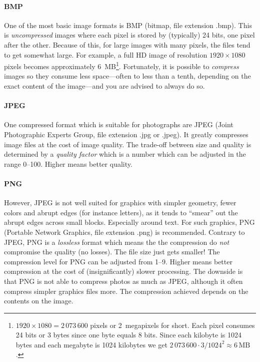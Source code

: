 {\paragraph{BMP}
One of the most basic image formats is BMP (bitmap, file extension .bmp). This is \emph{uncompressed} images where each pixel is stored by (typically) 24 bits, one pixel after the other. Because of this, for large images with many pixels, the files tend to get somewhat large. For example, a full HD image of resolution $1920\times 1080$ pixels becomes approximately 6~MB\footnote{$1920\times 1080=2\,073\,600$ pixels or 2~megapixels for short. Each pixel consumes 24 bits or 3 bytes since one byte equals 8 bits. Since each kilobyte is 1024 bytes and each megabyte is 1024 kilobytes we get $2\,073\,600\cdot 3/1024^2 \approx 6\,\mathrm{MB}$.}. Fortunately, it is possible to \emph{compress} images so they consume less space---often to less than a tenth, depending on the exact content of the image---and you are advised to always do so.

\paragraph{JPEG} One compressed format which is suitable for photographs are JPEG (Joint Photographic Experts Group, file extension .jpg or .jpeg). It greatly compresses image files at the cost of image quality. The trade-off between size and quality is determined by a \emph{quality factor} which is a number which can be adjusted in the range 0--100. Higher means better quality.

\paragraph{PNG} However, JPEG is not well suited for graphics with simpler geometry, fewer colors and abrupt edges (for instance letters), as it tends to ``smear'' out the abrupt edges across small blocks. Especially around text. For such graphics, PNG (Portable Network Graphics, file extension .png) is recommended. Contrary to JPEG, PNG is a \emph{lossless} format which means the the compression do \emph{not} compromise the quality (no losses). The file size just gets smaller! The compression level for PNG can be adjusted from 1--9. Higher means better compression at the cost of (insignificantly) slower processing. The downside is that PNG is not able to compress photos as much as JPEG, although it often compress simpler graphics files more. The compression achieved depends on the contents on the image.

}

